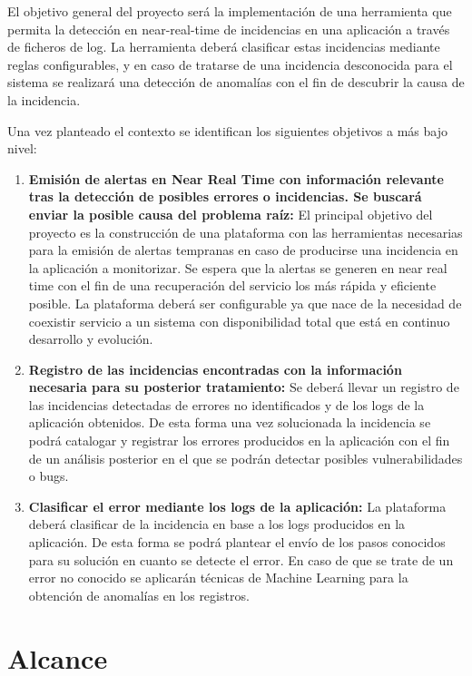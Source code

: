 El objetivo general del proyecto será la implementación de una herramienta que permita la detección en near-real-time de incidencias en una aplicación a través de ficheros de log. La herramienta deberá clasificar estas incidencias mediante reglas configurables, y en caso de tratarse de una incidencia desconocida para el sistema se realizará una detección de anomalías con el fin de descubrir la causa de la incidencia.

Una vez planteado el contexto se identifican los siguientes objetivos a más bajo nivel:

\begin{enumerate}
	\item \textbf{Emisión de alertas en Near Real Time con información relevante tras la detección de posibles errores o
incidencias. Se buscará enviar la posible causa del problema raíz:} El principal objetivo del proyecto es la construcción de una plataforma con las herramientas necesarias para la emisión de alertas tempranas en caso de producirse una incidencia en la aplicación a monitorizar. Se espera que la alertas se generen en near real time con el fin de una recuperación del servicio los más rápida y eficiente posible. La plataforma deberá ser configurable ya que nace de la necesidad de coexistir servicio a un sistema con disponibilidad total que está en continuo desarrollo y evolución.
	\item \textbf{Registro de las incidencias encontradas con la información necesaria para su posterior
tratamiento:} Se deberá llevar un registro de las incidencias detectadas de errores no identificados y de los logs de la aplicación obtenidos. De esta forma una vez solucionada la incidencia se podrá catalogar y registrar los errores producidos en la aplicación con el fin de un análisis posterior en el que se podrán detectar posibles vulnerabilidades o bugs.
	\item \textbf{Clasificar el error mediante los logs de la aplicación:} La plataforma deberá clasificar de la incidencia en base a los logs producidos en la aplicación. De esta forma se podrá plantear el envío de los pasos conocidos para su solución en cuanto se detecte el error. En caso de que se trate de un error no conocido se aplicarán técnicas de Machine Learning para la obtención de anomalías en los registros.
\end{enumerate}
	


\section{Alcance}

